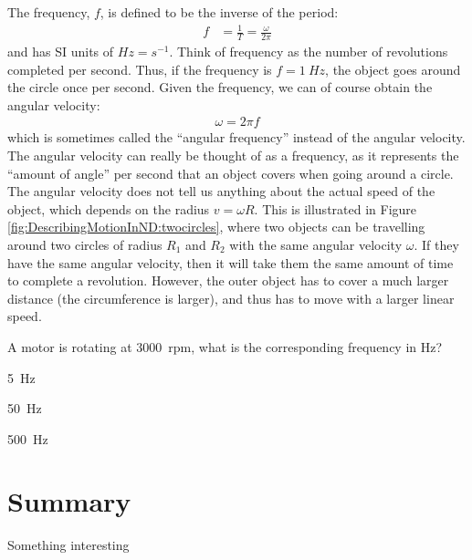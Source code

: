The frequency, $f$, is defined to be the inverse of the period:
\begin{align*}
f&=\frac{1}{T}=\frac{\omega}{2\pi}
\end{align*}
and has SI units of $\si{Hz}=\si{s^{-1}}$. Think of frequency as the number of revolutions completed per second. Thus, if the frequency is $f=\SI{1}{Hz}$, the object goes around the circle once per second. 
 Given the frequency, we can of course obtain the angular velocity:
\begin{align*}
\omega = 2\pi f
\end{align*}
which is sometimes called the ``angular frequency'' instead of the angular velocity. The angular velocity can really be thought of as a frequency, as it represents the ``amount of angle'' per second that an object covers when going around a circle. The angular velocity does not tell us anything about the actual speed of the object, which depends on the radius $v=\omega R$. This is illustrated in Figure \ref{fig:DescribingMotionInND:twocircles}, where two objects can be travelling around two circles of radius $R_1$ and $R_2$ with the same angular velocity $\omega$. If they have the same angular velocity, then it will take them the same amount of time to complete a revolution. However, the outer object has to cover a much larger distance (the circumference is larger), and thus has to move with a larger linear speed.

\begin{checkpointMC}{A motor is rotating at \SI{3000}{rpm}, what is the corresponding frequency in \si{Hz}?}
\item \SI{5}{Hz}
\item \SI{50}{Hz}%
\item \SI{500}{Hz}
\end{checkpointMC}


\newpage
\section{Summary}
\vspace{2cm}
\begin{chapterSummary}
\item Something interesting
\end{chapterSummary}

